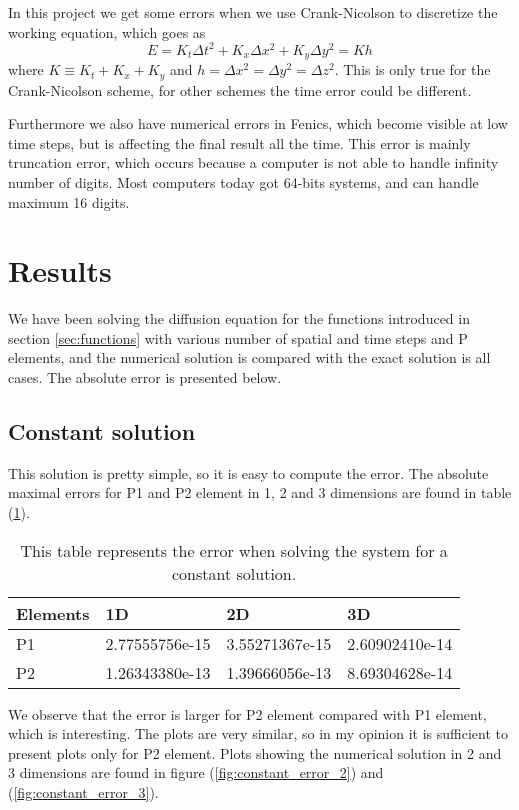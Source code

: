 \documentclass[norsk,a4paper,12pt]{article}
\begin{document}
In this project we get some errors when we use Crank-Nicolson to discretize the working equation, which goes as
\begin{equation}
E=K_t\Delta t^2 + K_x\Delta x^2 + K_y\Delta y^2= Kh
\end{equation}
where $K\equiv K_t + K_x + K_y$ and $h=\Delta x^2 = \Delta y^2 = \Delta z^2$. This is only true for the Crank-Nicolson scheme, for other schemes the time error could be different. 

Furthermore we also have numerical errors in Fenics, which become visible at low time steps, but is affecting the final result all the time. This error is mainly truncation error, which occurs because a computer is not able to handle infinity number of digits. Most computers today got 64-bits systems, and can handle maximum 16 digits. 

\section{Results}
We have been solving the diffusion equation for the functions introduced in section \ref{sec:functions} with various number of spatial and time steps and P elements, and the numerical solution is compared with the exact solution is all cases. The absolute error is presented below.

\subsection{Constant solution}
This solution is pretty simple, so it is easy to compute the error. The absolute maximal errors for P1 and P2 element in 1, 2 and 3 dimensions are found in table (\ref{tab:constant_error}). 
\begin{table} [H]
\centering
\caption{This table represents the error when solving the system for a constant solution. }
\begin{tabularx}{\textwidth}{XXXX} \hline
\label{tab:constant_error}
Elements & 1D & 2D & 3D \\ \hline
P1 & 2.77555756e-15 & 3.55271367e-15 & 2.60902410e-14 \\
P2 & 1.26343380e-13 & 1.39666056e-13 & 8.69304628e-14 \\ \hline
\end{tabularx}
\end{table}
We observe that the error is larger for P2 element compared with P1 element, which is interesting. The plots are very similar, so in my opinion it is sufficient to present plots only for P2 element. Plots showing the numerical solution in 2 and 3 dimensions are found in figure (\ref{fig:constant_error_2}) and (\ref{fig:constant_error_3}).
\end{document}
